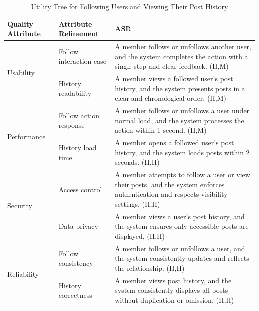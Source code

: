 \documentclass{article}
\begin{document}
\begin{table}[H]
    \centering
    \caption{Utility Tree for Following Users and Viewing Their Post History}
    \begin{tabular}{|p{3cm}|p{4cm}|p{7cm}|}
        \hline
        \textbf{Quality Attribute} & \textbf{Attribute Refinement}                                                                                                          & \textbf{ASR} \\
        \hline

        \multirow{2}{*}{Usability}
                                   & Follow interaction ease
                                   & A member follows or unfollows another user, and the system completes the action with a single step and clear feedback. (H,M)                          \\
        \cline{2-3}
                                   & History readability
                                   & A member views a followed user's post history, and the system presents posts in a clear and chronological order. (H,M)                                \\
        \hline

        \multirow{2}{*}{Performance}
                                   & Follow action response
                                   & A member follows or unfollows a user under normal load, and the system processes the action within 1 second. (H,M)                                    \\
        \cline{2-3}
                                   & History load time
                                   & A member opens a followed user's post history, and the system loads posts within 2 seconds. (H,H)                                                     \\
        \hline

        \multirow{2}{*}{Security}
                                   & Access control
                                   & A member attempts to follow a user or view their posts, and the system enforces authentication and respects visibility settings. (H,H)                \\
        \cline{2-3}
                                   & Data privacy
                                   & A member views a user's post history, and the system ensures only accessible posts are displayed. (H,H)                                               \\
        \hline

        \multirow{2}{*}{Reliability}
                                   & Follow consistency
                                   & A member follows or unfollows a user, and the system consistently updates and reflects the relationship. (H,H)                                        \\
        \cline{2-3}
                                   & History correctness
                                   & A member views post history, and the system consistently displays all posts without duplication or omission. (H,H)                                    \\
        \hline


\end{tabular}
\end{table}
\end{document}
